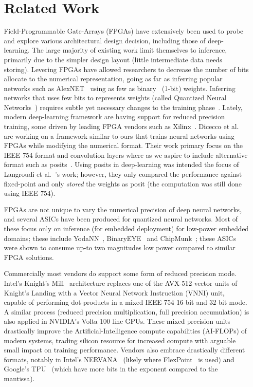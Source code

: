 \documentclass[techrep,english]{ipsj} %
\begin{document}
\section{Related Work}\label{sec:relwork}
Field-Programmable Gate-Arrays (FPGAs) have extensively been used to probe and explore various architectural design decision, including those of deep-learning.
The large majority of existing work limit themselves to inference, primarily due to the simpler design layout (little intermediate data needs storing).
Levering FPGAs have allowed researchers to decrease the number of bits allocate to the numerical representation, going as far as inferring popular networks such as  AlexNET~\cite{krizhevsky2012imagenet} using as few as binary~\cite{shimoda2017all,umuroglu2017finn} (1-bit) weights.
Inferring networks that uses few bits to represents weights (called Quantized Neural Networks~\cite{courbariaux2016binarized}) requires subtle yet necessary changes to the training phase~\cite{binaryconnect,courbariaux2016binarized,zhou2016dorefa}.
Lately, modern deep-learning framework are having support for reduced precision training, some driven by leading FPGA vendors such as Xilinx~\cite{xilinxml}.
Dicecco et al.~\cite{dicecco2017fpga} are working on a framework similar to ours that trains neural networks using FPGAs while modifying the numerical format.
Their work primary focus on the IEEE-754 format and convolution layers where-as we aspire to include alternative format such as posits~\cite{posits}.
Using posits in deep-learning was intended the focus of Langroudi et al.~\cite{langroudi2018deep}’s work; however, they only compared the performance against fixed-point and only \textit{stored} the weights as posit (the computation was still done using IEEE-754).

FPGAs are not unique to vary the numerical precision of deep neural networks, and several ASICs have been produced for quantized neural networks.
Most of these focus only on inference (for embedded deployment)  for low-power embedded domains; these include YodaNN~\cite{yodann}, BinaryEYE~\cite{binaryeye} and ChipMunk~\cite{chipmunk}; these ASICs were shown to consume up-to two magnitudes low power compared to similar FPGA solutions.

Commercially most vendors do support some form of reduced precision mode.
Intel’s Knight’s Mill~\cite{knm} architecture replaces one of the AVX-512 vector units of Knight’s Landing with a Vector Neural Network Instruction (VNNI) unit, capable of performing dot-products in a mixed IEEE-754 16-bit and 32-bit mode.
A similar process (reduced precision multiplication, full precision accumulation) is also applied in NVIDIA’s Volta-100 line GPUs.
These mixed-precision units drastically improve the Artificial-Intelligence compute capabilities (AI-FLOPs) of modern systems, trading silicon resource for increased compute with arguable small impact on training performance.
Vendors also embrace drastically different formats, notably in Intel’s NERVANA~\cite{nervana} (likely where FlexPoint~\cite{intelflexpoint} is used) and Google’s TPU~\cite{tpuformat} (which have more bits in the exponent compared to the mantissa).
\end{document}
